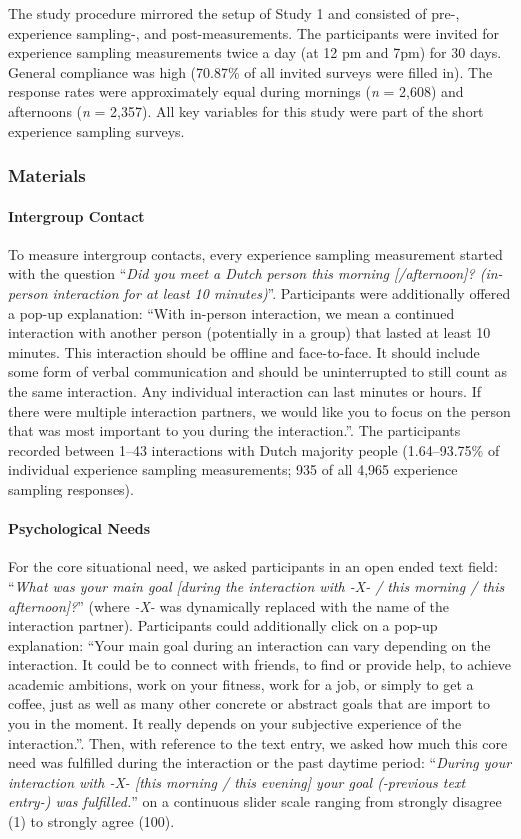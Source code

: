 The study procedure mirrored the setup of Study 1 and consisted of pre-,
experience sampling-, and post-measurements. The participants were
invited for experience sampling measurements twice a day (at 12 pm and
7pm) for 30 days. General compliance was high (70.87\% of all invited
surveys were filled in). The response rates were approximately equal
during mornings (\textit{n} = 2,608) and afternoons (\textit{n} =
2,357). All key variables for this study were part of the short
experience sampling surveys.

\subsubsection{Materials}

\paragraph{Intergroup Contact}

To measure intergroup contacts, every experience sampling measurement
started with the question
``\textit{Did you meet a Dutch person this morning [/afternoon]? (in-person interaction for at least 10 minutes)}''.
Participants were additionally offered a pop-up explanation: ``With
in-person interaction, we mean a continued interaction with another
person (potentially in a group) that lasted at least 10 minutes. This
interaction should be offline and face-to-face. It should include some
form of verbal communication and should be uninterrupted to still count
as the same interaction. Any individual interaction can last minutes or
hours. If there were multiple interaction partners, we would like you to
focus on the person that was most important to you during the
interaction.''. The participants recorded between 1--43 interactions
with Dutch majority people (1.64--93.75\% of individual experience
sampling measurements; 935 of all 4,965 experience sampling responses).

\paragraph{Psychological Needs}

For the core situational need, we asked participants in an open ended
text field:
``\textit{What was your main goal [during the interaction with -X- / this morning / this afternoon]?}''
(where \textit{-X-} was dynamically replaced with the name of the
interaction partner). Participants could additionally click on a pop-up
explanation: ``Your main goal during an interaction can vary depending
on the interaction. It could be to connect with friends, to find or
provide help, to achieve academic ambitions, work on your fitness, work
for a job, or simply to get a coffee, just as well as many other
concrete or abstract goals that are import to you in the moment. It
really depends on your subjective experience of the interaction.''.
Then, with reference to the text entry, we asked how much this core need
was fulfilled during the interaction or the past daytime period:
``\textit{During your interaction with -X- [this morning / this evening] your goal (-previous text entry-) was fulfilled.}''
on a continuous slider scale ranging from strongly disagree (1) to
strongly agree (100).

